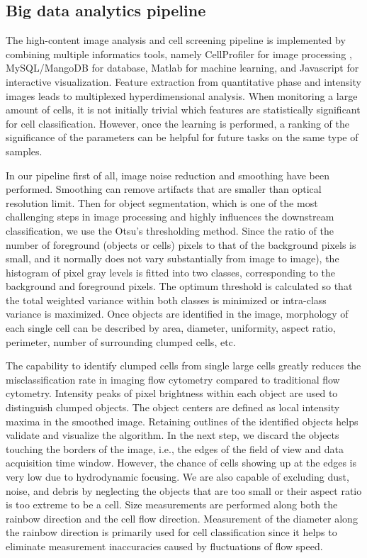 \documentclass[aps,pra,reprint,superscriptaddress]{revtex4-1}
\begin{document}
\subsection{Big data analytics pipeline}

The high-content image analysis and cell screening pipeline is implemented by combining multiple informatics tools, namely CellProfiler for image processing \cite{carpenter2006cellprofiler,kamentsky2011improved}, MySQL/MangoDB for database, Matlab for machine learning, and Javascript for interactive visualization. 
Feature extraction from quantitative phase and intensity images leads to multiplexed hyperdimensional analysis. When monitoring a large amount of cells, it is not initially trivial which features are statistically significant for cell classification. However, once the learning is performed, a ranking of the significance of the parameters can be helpful for future tasks on the same type of samples. 

In our pipeline first of all, image noise reduction and smoothing have been performed. Smoothing can remove artifacts that are smaller than optical resolution limit. Then for object segmentation, which is one of the most challenging steps in image processing and highly influences the downstream classification, we use the Otsu's thresholding method. Since the ratio of the number of foreground (objects or cells) pixels to that of the background pixels is small, and it normally does not vary substantially from image to image), the histogram of pixel gray levels is fitted into two classes,  corresponding to the background and foreground pixels. The optimum threshold is calculated so that the total weighted variance within both classes is minimized or intra-class variance is maximized. Once objects are identified in the image, morphology of each single cell can be described by area, diameter, uniformity, aspect ratio, perimeter, number of surrounding clumped cells, etc.

The capability to identify clumped cells from single large cells greatly reduces the misclassification rate in imaging flow cytometry compared to traditional flow cytometry. Intensity peaks of pixel brightness within each object are used to distinguish clumped objects. The object centers are defined as local intensity maxima in the smoothed image. Retaining outlines of the identified objects helps validate and visualize the algorithm. In the next step, we discard the objects touching the borders of the image, i.e., the edges of the field of view and data acquisition time window. However, the chance of cells showing up at the edges is very low due to hydrodynamic focusing. We are also capable of excluding dust, noise, and debris by neglecting the objects that are too small or their aspect ratio is too extreme to be a cell. Size measurements are performed along both the rainbow direction and the cell flow direction. Measurement of the diameter along the rainbow direction is primarily used for cell classification since it helps to eliminate measurement inaccuracies caused by fluctuations of flow speed. 
\end{document}
